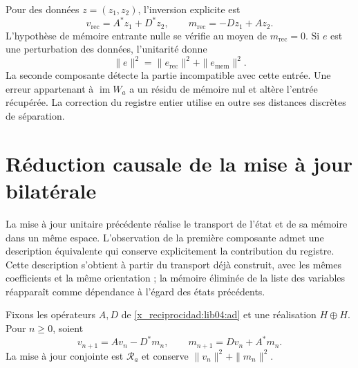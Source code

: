 Pour des données \(z=(z_1,z_2)\), l'inversion explicite est
\begin{equation}
 v_{\mathrm{rec}}=A^*z_1+D^*z_2,\qquad
 m_{\mathrm{rec}}=-Dz_1+Az_2.
 \label{x_reciprocidad:lib04:inversa-unitaria}
\end{equation}
L’hypothèse de mémoire entrante nulle se vérifie au moyen de
\(m_{\mathrm{rec}}=0\). Si \(e\) est une perturbation des données,
l’unitarité donne
\begin{equation}
 \|e\|^2=\|e_{\mathrm{rec}}\|^2+\|e_{\mathrm{mem}}\|^2.
 \label{x_reciprocidad:lib04:descomposicion-ruido}
\end{equation}
La seconde composante détecte la partie incompatible avec cette entrée. Une erreur appartenant à \(\operatorname{im}W_a\) a un résidu de mémoire nul et altère l'entrée récupérée. La correction du registre entier utilise en outre ses distances discrètes de séparation.


\section{Réduction causale de la mise à jour bilatérale}
\label{x_reciprocidad:lib04:reduccion-causal}

La mise à jour unitaire précédente réalise le transport de l’état et de sa
mémoire dans un même espace. L’observation de la première composante admet
une description équivalente qui conserve explicitement la contribution du
registre. Cette description s’obtient à partir du transport déjà construit, avec les
mêmes coefficients et la même orientation ; la mémoire éliminée de la liste
des variables réapparaît comme dépendance à l’égard des états précédents.

Fixons les opérateurs \(A,D\) de \eqref{x_reciprocidad:lib04:ad} et une réalisation \(H\oplus H\). Pour \(n\geq0\), soient
\begin{equation}
 v_{n+1}=Av_n-D^*m_n,\qquad
 m_{n+1}=Dv_n+A^*m_n.
 \label{x_reciprocidad:lib04:recurrencia-memoria}
\end{equation}
La mise à jour conjointe est \(\mathscr R_a\) et conserve \(\|v_n\|^2+\|m_n\|^2\).

